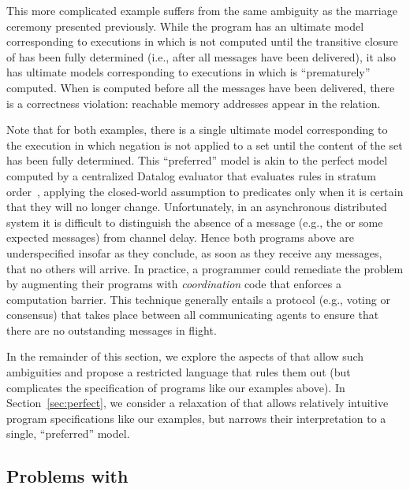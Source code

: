 This more complicated example suffers from the same ambiguity as the marriage
ceremony presented previously.  While the program has an ultimate model
corresponding to executions in which  is not computed until the
transitive closure of  has been fully determined (i.e.,
after all messages have been delivered), it also has ultimate models
corresponding to executions in which  is ``prematurely''
computed.  When  is computed before all the 
messages have been delivered, there is a correctness violation: reachable memory
addresses appear in the  relation.

Note that for both examples, there is a single ultimate model corresponding to
the execution in which negation is not applied to a set until the content of the
set has been fully determined.  This ``preferred'' model is akin to the perfect
model computed by a centralized Datalog evaluator that evaluates rules in
stratum order~\cite{ullmanbook}, applying the closed-world assumption to
predicates only when it is certain that they will no longer change.
Unfortunately, in an asynchronous distributed system it is difficult to
distinguish the absence of a message (e.g., the  or some
expected  messages) from channel delay.  Hence both programs
above are underspecified insofar as they conclude, as soon as they receive any
messages, that no others will arrive.  In practice, a programmer could remediate
the problem by augmenting their programs with \emph{coordination} code that
enforces a computation barrier.  This technique generally entails a protocol
(e.g., voting or consensus) that takes place between all communicating agents to
ensure that there are no outstanding messages in flight.

In the remainder of this section, we explore the aspects of \lang that allow
such ambiguities and propose a restricted language \slang that rules them out
(but complicates the specification of programs like our examples above).  In
Section~\ref{sec:perfect}, we consider a relaxation of \slang that allows
relatively intuitive program specifications like our examples, but narrows their
interpretation to a single, ``preferred'' model.

\subsection{Problems with \large \bf \lang}

